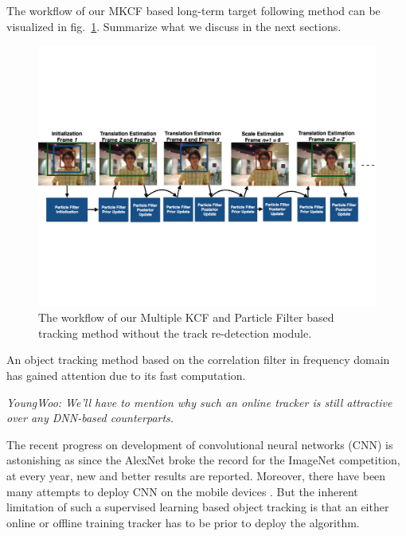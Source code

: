 \documentclass[10pt,twocolumn,letterpaper]{article}
\newcounter{ct}
\begin{document}
The workflow of our MKCF based long-term target following method can
be visualized in fig.~\ref{Workflow_figure}. Summarize what we discuss
in the next sections.
\begin{figure}[!t]
\includegraphics[width=\textwidth]{figures/Workflow_MKCF+PF.pdf}
\caption{The workflow of our Multiple KCF and Particle Filter based tracking method without the track re-detection module.}
\label{Workflow_figure}
\end{figure}

An object tracking method based on the correlation filter in frequency
domain has gained attention due to its fast computation.

{\it YoungWoo: We'll have to mention why such an online tracker is
  still attractive over any DNN-based counterparts.}

The recent progress on development of convolutional neural networks
(CNN) is astonishing as since the AlexNet \cite{krizhevsky12} broke
the record for the ImageNet competition, at every year, new and better
results are reported. Moreover, there have been many attempts to
deploy CNN on the mobile devices
\cite{wu2016quantized,giusti2015}. But the inherent limitation of such
a supervised learning based object tracking is that an either online
\cite{nam2016} or offline \cite{held2016} training tracker has to be
prior to deploy the algorithm.
\end{document}
